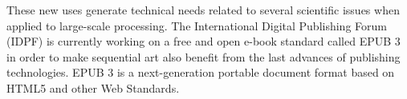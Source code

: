 These new uses generate technical needs related to several
scientific issues when applied to large-scale processing. 
The International Digital Publishing Forum (IDPF) is currently working on a free and open e-book standard called EPUB 3 in order to make sequential art also benefit from the last advances of publishing technologies.
EPUB 3 is a next-generation portable document format based on HTML5 and other Web Standards.

















